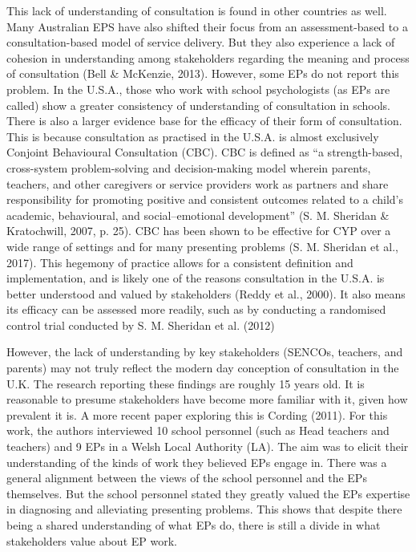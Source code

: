 \documentclass[
  english,
  man]{apa}
\begin{document}
This lack of understanding of consultation is found in other countries as well. Many Australian EPS have also shifted their focus from an assessment-based to a consultation-based model of service delivery. But they also experience a lack of cohesion in understanding among stakeholders regarding the meaning and process of consultation (Bell \& McKenzie, 2013). However, some EPs do not report this problem. In the U.S.A., those who work with school psychologists (as EPs are called) show a greater consistency of understanding of consultation in schools. There is also a larger evidence base for the efficacy of their form of consultation. This is because consultation as practised in the U.S.A. is almost exclusively Conjoint Behavioural Consultation (CBC). CBC is defined as ``a strength-based, cross-system problem-solving and decision-making model wherein parents, teachers, and other caregivers or service providers work as partners and share responsibility for promoting positive and consistent outcomes related to a child's academic, behavioural, and social--emotional development'' (S. M. Sheridan \& Kratochwill, 2007, p. 25). CBC has been shown to be effective for CYP over a wide range of settings and for many presenting problems (S. M. Sheridan et al., 2017). This hegemony of practice allows for a consistent definition and implementation, and is likely one of the reasons consultation in the U.S.A. is better understood and valued by stakeholders (Reddy et al., 2000). It also means its efficacy can be assessed more readily, such as by conducting a randomised control trial conducted by S. M. Sheridan et al. (2012)

However, the lack of understanding by key stakeholders (SENCOs, teachers, and parents) may not truly reflect the modern day conception of consultation in the U.K. The research reporting these findings are roughly 15 years old. It is reasonable to presume stakeholders have become more familiar with it, given how prevalent it is. A more recent paper exploring this is Cording (2011). For this work, the authors interviewed 10 school personnel (such as Head teachers and teachers) and 9 EPs in a Welsh Local Authority (LA). The aim was to elicit their understanding of the kinds of work they believed EPs engage in. There was a general alignment between the views of the school personnel and the EPs themselves. But the school personnel stated they greatly valued the EPs expertise in diagnosing and alleviating presenting problems. This shows that despite there being a shared understanding of what EPs do, there is still a divide in what stakeholders value about EP work.
\end{document}
